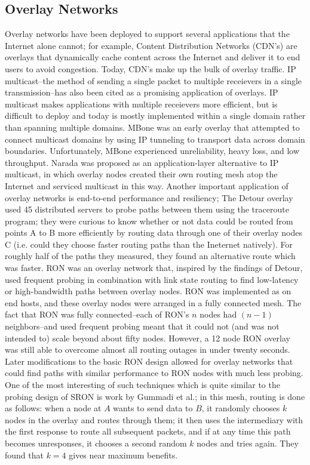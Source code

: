 \documentclass[pageno]{jpaper}
\begin{document}
\subsection{Overlay Networks}
Overlay networks have been deployed to support several applications that the Internet
alone cannot; for example, Content Distribution Networks (CDN's) are overlays that 
dynamically cache content across the Internet and deliver it to end users to avoid congestion.
Today, CDN's make up the bulk of overlay traffic\cite{kurian}.\bigskip
IP multicast--the method of sending a single packet to multiple receievers in a single transmission--has also been cited as a promising application of overlays.  IP multicast makes applications with multiple receievers more efficient, but is difficult to deploy and today is mostly implemented within a single domain rather than spanning multiple domains\cite{kurian}.  MBone\cite{Macedonia:1994:MPA:618987.620017} was an early overlay that attempted to connect multicast domains by using IP tunneling to transport data across domain boundaries.  Unfortunately, MBone experienced unreliability, heavy loss, and low throughput\cite{kurian}.  Narada\cite{Banerjee:2002:SAL:964725.633045} was proposed as an application-layer alternative to IP multicast, in which overlay nodes created their own routing mesh atop the Internet and serviced multicast in this way.\bigskip
Another important application of overlay networks is end-to-end performance and resiliency; The Detour\cite{Savage:1999:DII:623285.624244} overlay used 45 distributed servers to probe paths between them using the traceroute program; they were curious to know whether or not data could be routed from points A to B more efficiently by routing data through one of their overlay nodes C (i.e. could they choose faster routing paths than the Ineternet natively).  For roughly half of the paths they measured, they found an alternative route which was faster.  RON\cite{ron} was an overlay network that, inspired by the findings of Detour, used frequent probing in combination with link state routing to find low-latency or high-bandwidth paths between overlay nodes.  RON was implemented as on end hosts, and these overlay nodes were arranged in a fully connected mesh.  The fact that RON was fully connected--each of RON's $n$ nodes had $(n-1)$ neighbors--and used frequent probing meant that it could not (and was not intended to) scale beyond about fifty nodes.  However, a 12 node RON overlay was still able to overcome almost all routing outages in under twenty seconds.
Later modifications to the basic RON design allowed for overlay networks that could find paths with similar performance to RON nodes with much less probing.  One of the most interesting of such techniques which is quite similar to the probing design of SRON is work by Gummadi et al.\cite{Gummadi:2004:IRI:1251254.1251267}; in this mesh, routing is done as follows: when a node at $A$ wants to send data to $B$, it randomly chooses $k$ nodes in the overlay and routes through them; it then uses the intermediary with the first response to route all subsequent packets, and if at any time this path becomes unresponses, it chooses a second random $k$ nodes and tries again.  They found that $k=4$ gives near maximum benefits. 
\end{document}
